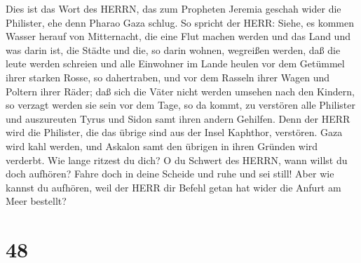  Dies ist das Wort des HERRN, das zum Propheten Jeremia
geschah wider die Philister, ehe denn Pharao Gaza schlug. 
So spricht der HERR: Siehe, es kommen Wasser herauf von Mitternacht, die
eine Flut machen werden und das Land und was darin ist, die Städte und
die, so darin wohnen, wegreißen werden, daß die leute werden schreien
und alle Einwohner im Lande heulen  vor dem Getümmel ihrer
starken Rosse, so dahertraben, und vor dem Rasseln ihrer Wagen und
Poltern ihrer Räder; daß sich die Väter nicht werden umsehen nach den
Kindern, so verzagt werden sie sein  vor dem Tage, so da
kommt, zu verstören alle Philister und auszureuten Tyrus und Sidon samt
ihren andern Gehilfen. Denn der HERR wird die Philister, die das übrige
sind aus der Insel Kaphthor, verstören.  Gaza wird kahl
werden, und Askalon samt den übrigen in ihren Gründen wird verderbt. Wie
lange ritzest du dich?  O du Schwert des HERRN, wann willst
du doch aufhören? Fahre doch in deine Scheide und ruhe und sei still!
 Aber wie kannst du aufhören, weil der HERR dir Befehl getan
hat wider die Anfurt am Meer bestellt?

\hypertarget{section-47}{%
\section{48}\label{section-47}}

